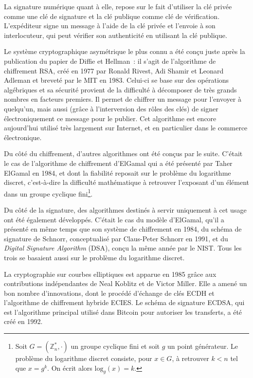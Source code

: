 \documentclass[
  a5paper,
  smalldemyvopaper,10pt,twoside,onecolumn,openright,extrafontsizes,hidelinks]{memoir}
\begin{document}
La signature numérique quant à elle, repose sur le fait d'utiliser la
clé privée comme une clé de signature et la clé publique comme clé de
vérification. L'expéditeur signe un message à l'aide de la clé privée et
l'envoie à son interlocuteur, qui peut vérifier son authenticité en
utilisant la clé publique.

Le système cryptographique asymétrique le plus connu a été conçu juste
après la publication du papier de Diffie et Hellman~: il s'agit de
l'algorithme de chiffrement RSA, créé en 1977 par Ronald Rivest, Adi
Shamir et Leonard Adleman et breveté par le MIT en 1983. Celui-ci se
base sur des opérations algébriques et sa sécurité provient de la
difficulté à décomposer de très grands nombres en facteurs premiers. Il
permet de chiffrer un message pour l'envoyer à quelqu'un, mais aussi
(grâce à l'interversion des rôles des clés) de signer électroniquement
ce message pour le publier. Cet algorithme est encore aujourd'hui
utilisé très largement sur Internet, et en particulier dans le commerce
électronique.

Du côté du chiffrement, d'autres algorithmes ont été conçus par le
suite. C'était le cas de l'algorithme de chiffrement d'ElGamal qui a été
présenté par Taher ElGamal en 1984, et dont la fiabilité reposait sur le
problème du logarithme discret, c'est-à-dire la difficulté mathématique
à retrouver l'exposant d'un élément dans un groupe cyclique
fini\footnote{Soit \(G = (\mathbb{Z}_n^*, \cdot)\) un groupe cyclique
  fini et soit \(g\) un point générateur. Le problème du logarithme
  discret consiste, pour \(x \in G\), à retrouver \(k < n\) tel que
  \(x = g^k\). On écrit alors \(\mathrm{log}_g (x) = k\).}.

Du côté de la signature, des algorithmes destinés à servir uniquement à
cet usage ont été également développés. C'était le cas du modèle
d'ElGamal, qu'il a présenté en même temps que son système de chiffrement
en 1984, du schéma de signature de Schnorr, conceptualisé par
Claus-Peter Schnorr en 1991, et du \emph{Digital Signature Algorithm}
(DSA), conçu la même année par le NIST. Tous les trois se basaient aussi
sur le problème du logarithme discret.

La cryptographie sur courbes elliptiques est apparue en 1985 grâce aux
contributions indépendantes de Neal Koblitz et de Victor Miller. Elle a
amené un bon nombre d'innovations, dont le procédé d'échange de clés
ECDH et l'algorithme de chiffrement hybride ECIES. Le schéma de
signature ECDSA, qui est l'algorithme principal utilisé dans Bitcoin
pour autoriser les transferts, a été créé en 1992.
\end{document}
